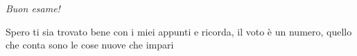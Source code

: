\thispagestyle{empty}

\vspace*{\fill}
\begingroup
\itshape
Buon esame!

Spero ti sia trovato bene con i miei appunti e ricorda, il voto è un numero, quello che conta sono le cose nuove che impari


\endgroup
\vfill

